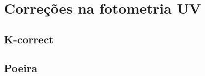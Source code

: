 

\section{Correções na fotometria UV}
\label{sec:Crossmatch:Correcoes}

\subsection{K-correct}

\subsection{Poeira}


